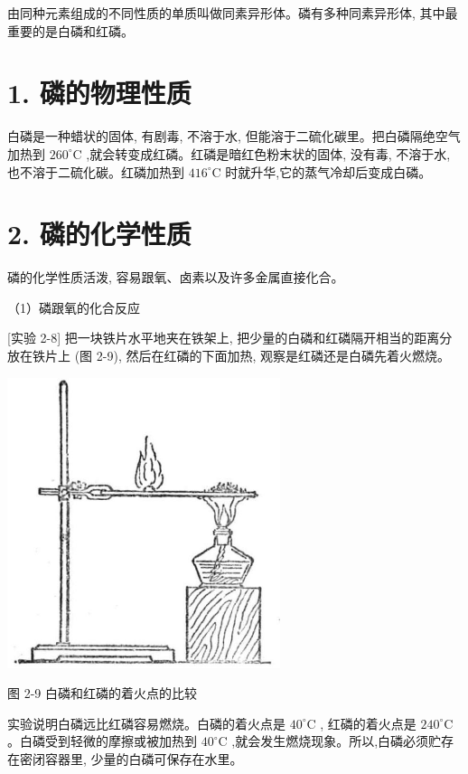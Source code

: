 \documentclass[10pt]{article}
\begin{document}
由同种元素组成的不同性质的单质叫做同素异形体。磷有多种同素异形体, 其中最重要的是白磷和红磷。

\section*{1. 磷的物理性质}

白磷是一种蜡状的固体, 有剧毒, 不溶于水, 但能溶于二硫化碳里。把白磷隔绝空气加热到 \({260}^{ \circ }\mathrm{C}\) ,就会转变成红磷。红磷是暗红色粉末状的固体, 没有毒, 不溶于水, 也不溶于二硫化碳。红磷加热到 \({416}^{ \circ }\mathrm{C}\) 时就升华,它的蒸气冷却后变成白磷。

\section*{2. 磷的化学性质}

磷的化学性质活泼, 容易跟氧、卤素以及许多金属直接化合。

（1）磷跟氧的化合反应

[实验 2-8] 把一块铁片水平地夹在铁架上, 把少量的白磷和红磷隔开相当的距离分放在铁片上 (图 2-9), 然后在红磷的下面加热, 观察是红磷还是白磷先着火燃烧。

\begin{center}
\includegraphics[max width=0.6\textwidth]{images/01912d13-9986-7822-a012-3f3f7be99dcb_57_701972.jpg}
\end{center}

图 2-9 白磷和红磷的着火点的比较

实验说明白磷远比红磷容易燃烧。白磷的着火点是 \({40}^{ \circ }\mathrm{C}\) , 红磷的着火点是 \({240}^{ \circ }\mathrm{C}\) 。白磷受到轻微的摩擦或被加热到 \({40}^{ \circ }\mathrm{C}\) ,就会发生燃烧现象。所以,白磷必须贮存在密闭容器里, 少量的白磷可保存在水里。
\end{document}
